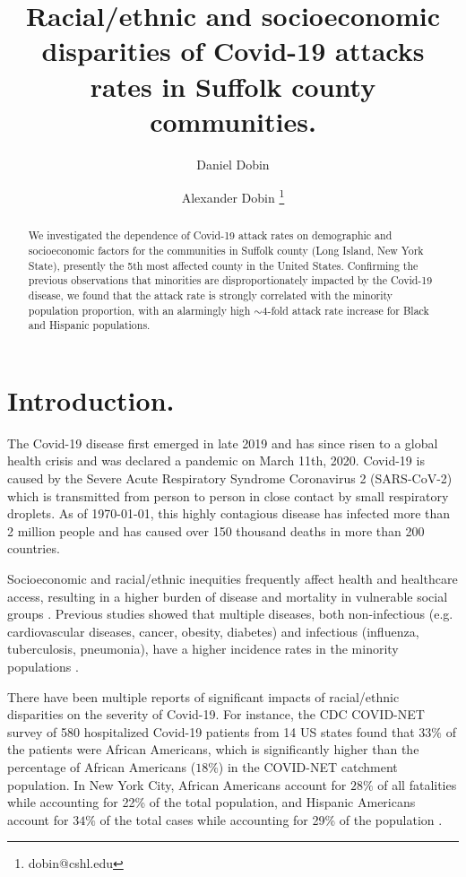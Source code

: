 \documentclass[twoside,12pt,onecolumn]{article}
\title{Racial/ethnic and socioeconomic disparities of Covid-19 attacks rates in Suffolk county communities.}
\author[1]{Daniel Dobin}
\author[2]{Alexander Dobin  \thanks{dobin@cshl.edu}}
\affil[1]{Candlewood Middle School, New York, USA}
\affil[2]{Cold Spring Harbor Laboratory, New York, USA}
\date{}
\begin{document}
\maketitle

\begin{abstract}
We investigated the dependence of Covid-19 attack rates on demographic and socioeconomic factors for the communities in Suffolk county (Long Island, New York State), presently the 5th most affected county in the United States. Confirming the previous observations that minorities are disproportionately impacted by the Covid-19 disease, we found that the attack rate is strongly correlated with the minority population proportion, with an alarmingly high $\sim4$-fold attack rate increase for Black and Hispanic populations.
\end{abstract}

\section{Introduction.}
The Covid-19 disease first emerged in late 2019 and has since risen to a global health crisis and was declared a pandemic on March 11th, 2020. Covid-19 is caused by the Severe Acute Respiratory Syndrome Coronavirus 2 (SARS-CoV-2) which is transmitted from person to person in close contact by small respiratory droplets. As of \today, this highly contagious disease has infected more than 2 million people and has caused over 150 thousand deaths in more than 200 countries.

Socioeconomic and racial/ethnic inequities frequently affect health and healthcare access, resulting in a higher burden of disease and mortality in vulnerable social groups \cite{Braveman2010,Flores2010,Nesbitt2016,Williams2016}.
Previous studies showed that multiple diseases, both non-infectious (e.g. cardiovascular diseases, cancer, obesity, diabetes) and infectious (influenza, tuberculosis, pneumonia), have a higher incidence rates in the minority populations \cite{Graham_heartDispar_2015,Ozdemir_cancerDispar_2017,Bhupathiraju_obesityDiabetes_2016,Quinn_influenza_2011,_tuberculosis_2004,Burton_pneumonia_2010}.

There have been multiple reports of significant impacts of racial/ethnic disparities on the severity of Covid-19. For instance, the CDC COVID-NET survey of 580 hospitalized Covid-19 patients from 14 US states \cite{COVID-NET_2020} found that $33\%$ of the patients were African Americans, which is significantly higher than the  percentage of African Americans ($18\%$) in the COVID-NET catchment population. In New York City, African Americans account for $28\%$ of all fatalities while accounting for 22\% of the total population, and Hispanic Americans account for $34\%$ of the total cases while accounting for 29\% of the population \cite{NYS_COVID19_tracker} .
\end{document}

